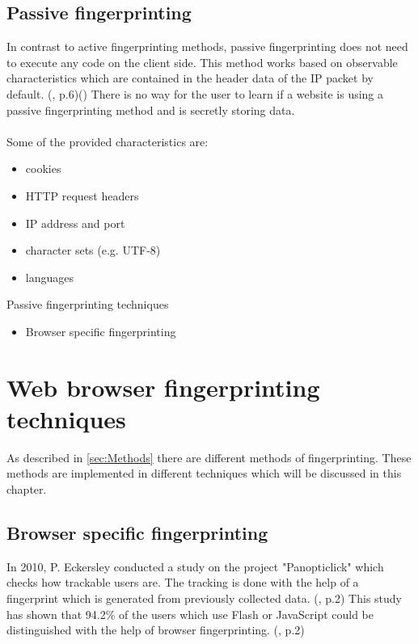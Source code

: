 \subsection{Passive fingerprinting}
In contrast to active fingerprinting methods, passive fingerprinting does not need to execute any code on the client side. This method works based on observable characteristics which are contained in the header data of the IP packet by default. (\textcite{doty18}, p.6)(\textcite{web17}) There is no way for the user to learn if a website is using a passive fingerprinting method and is secretly storing data.\\\\
Some of the provided characteristics are:
\begin{itemize}
	\item cookies
	\item HTTP request headers
	\item IP address and port
	\item character sets (e.g. UTF-8)
	\item languages\\
\end{itemize}
Passive fingerprinting techniques
\begin{itemize}
	\item Browser specific fingerprinting
\end{itemize}

\section{Web browser fingerprinting techniques}\label{sec:Techniques}
As described in \autoref{sec:Methods} there are different methods of fingerprinting. These methods are implemented in different techniques which will be discussed in this chapter.
\subsection{Browser specific fingerprinting} \label{specFP}
In 2010, P. Eckersley conducted a study on the project "Panopticlick" which checks how trackable users are. The tracking is done with the help of a fingerprint which is generated from previously collected data. (\textcite{upi15}, p.2) This study has shown that 94.2\% of the users which use Flash or JavaScript could be distinguished with the help of browser fingerprinting. (\textcite{eckersley10}, p.2)
